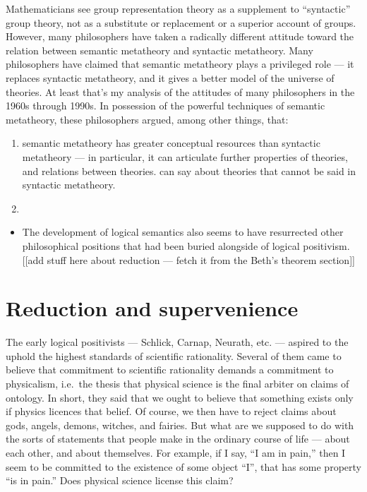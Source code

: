 Mathematicians see group representation theory as a supplement to
``syntactic'' group theory, not as a substitute or replacement or a
superior account of groups.  However, many philosophers have taken a
radically different attitude toward the relation between semantic
metatheory and syntactic metatheory.  Many philosophers have claimed
that semantic metatheory plays a privileged role --- it replaces
syntactic metatheory, and it gives a better model of the universe of
theories.  At least that's my analysis of the attitudes of many
philosophers in the 1960s through 1990s.  In possession of the
powerful techniques of semantic metatheory, these philosophers argued,
among other things, that:
\begin{enumerate}
\item semantic metatheory has greater conceptual resources than
  syntactic metatheory --- in particular, it can articulate further
  properties of theories, and relations between theories. can say
  about theories that cannot be said in syntactic metatheory.
  \item \end{enumerate}

 \begin{itemize}
  \item The development of logical semantics also seems to have
    resurrected other philosophical positions that had been buried
    alongside of logical positivism.  [[add stuff here about reduction
    --- fetch it from the Beth's theorem section]]

\end{itemize}

\section{Reduction and supervenience}

The early logical positivists --- Schlick, Carnap, Neurath, etc. ---
aspired to the uphold the highest standards of scientific rationality.
Several of them came to believe that commitment to scientific
rationality demands a commitment to physicalism, i.e.\ the thesis that
physical science is the final arbiter on claims of ontology.  In
short, they said that we ought to believe that something exists only
if physics licences that belief.  Of course, we then have to reject
claims about gods, angels, demons, witches, and fairies.  But what are
we supposed to do with the sorts of statements that people make in the
ordinary course of life --- about each other, and about themselves.
For example, if I say, ``I am in pain,'' then I seem to be committed
to the existence of some object ``I'', that has some property ``is in
pain.''  Does physical science license this claim?

